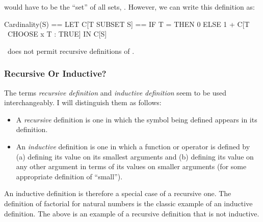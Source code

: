 \documentclass[fleqn,leqno]{article}
\begin{document}
would have to be the ``set'' of all sets, 
  .
However, we can write this definition as:
\begin{widedisplay}
\begin{notla}
Cardinality(S) == 
  LET C[T \in SUBSET S] == 
          IF T = {} THEN 0
                    ELSE 1 + C[T \ {CHOOSE x \in T : TRUE}]
  IN C[S]
\end{notla}
\begin{tlatex}
%
%
%
%
\end{tlatex}
\end{widedisplay}
\tlaplus\ does not permit recursive definitions of 
.

\subsubsection[Recursive Or Inductive?]{Recursive Or Inductive?%
}

The terms \emph{recursive definition} and \emph{inductive definition}
seem to be used interchangeably.  I will distinguish them as follows:
\begin{itemize}

\item A \emph{recursive} definition is one in which the symbol being defined
appears in its definition.  

\item An \emph{inductive} definition is one in which a function or
operator is defined by (a) defining its value on its smallest
arguments and (b) defining its value on any other argument in terms of
its values on smaller arguments (for some appropriate definition of
``small'').
\end{itemize}
An inductive definition is therefore a special case of a recursive
one.  The definition of factorial for natural numbers is the classic
example of an inductive definition.  The  above is an example of a recursive definition that is not
inductive.
\end{document}
